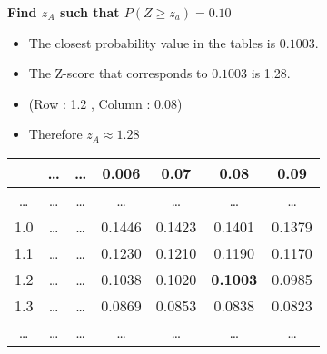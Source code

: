 \documentclass[a4paper,12pt]{article}
\begin{document}
\noindent \textbf{Find $z_A$ such that $ P(Z \geq z_a) = 0.10$}
\begin{itemize}
\item The closest probability value in the tables is $0.1003$.
\item The Z-score that corresponds to $0.1003$ is 1.28.
\item (Row : 1.2 , Column : 0.08)
\item Therefore $z_A  \approx 1.28$
\end{itemize}
\newpage
\begin{table}[ht]
\centering %
\begin{tabular}{|c|| c| c| c| c| c| c|} %
\hline %
& \ldots & \ldots & 0.006 &0.07&0.08&0.09 \\
\hline \hline%
\ldots & \ldots & \ldots &\ldots& \ldots &\ldots&\dots \\ %
1.0 & \ldots & \ldots &0.1446& 0.1423 &0.1401&0.1379 \\ %
1.1 & \ldots & \ldots&0.1230& 0.1210 &0.1190&0.1170 \\ %
1.2 & \ldots & \ldots&0.1038 & 0.1020 &\textbf{0.1003}&0.0985\\
1.3 & \ldots & \ldots &0.0869& 0.0853 &0.0838&0.0823 \\ %
\ldots & \ldots &\ldots&\ldots & \ldots &\ldots&\ldots\\
\hline %
\end{tabular}
\end{table}
\end{document}
